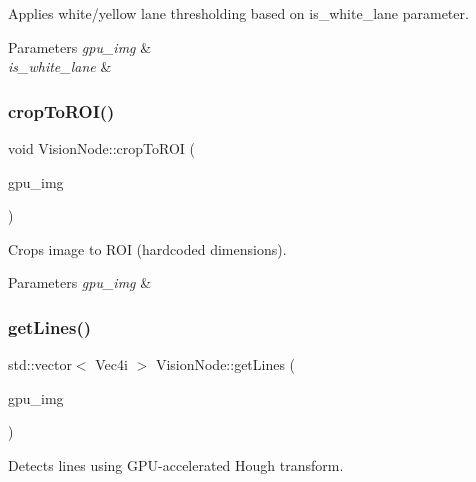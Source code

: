 Applies white/yellow lane thresholding based on {\ttfamily is\+\_\+white\+\_\+lane} parameter. 


\begin{DoxyParams}{Parameters}
{\em gpu\+\_\+img} & \\
\hline
{\em is\+\_\+white\+\_\+lane} & \\
\hline
\end{DoxyParams}
\mbox{\label{classVisionNode_a7d60e45e5c445469ecb9f298c47bf5c8}} 
\subsubsection{\texorpdfstring{crop\+To\+R\+O\+I()}{cropToROI()}}
{\footnotesize\ttfamily void Vision\+Node\+::crop\+To\+R\+OI (\begin{DoxyParamCaption}\item[{cv\+::cuda\+::\+Gpu\+Mat \&}]{gpu\+\_\+img }\end{DoxyParamCaption})\hspace{0.3cm}{\ttfamily [private]}}



Crops image to R\+OI (hardcoded dimensions). 


\begin{DoxyParams}{Parameters}
{\em gpu\+\_\+img} & \\
\hline
\end{DoxyParams}
\mbox{\label{classVisionNode_adf0f075a5d4706a887ba3198799a836f}} 
\subsubsection{\texorpdfstring{get\+Lines()}{getLines()}}
{\footnotesize\ttfamily std\+::vector$<$ Vec4i $>$ Vision\+Node\+::get\+Lines (\begin{DoxyParamCaption}\item[{cv\+::cuda\+::\+Gpu\+Mat \&}]{gpu\+\_\+img }\end{DoxyParamCaption})\hspace{0.3cm}{\ttfamily [private]}}



Detects lines using G\+P\+U-\/accelerated Hough transform. 


